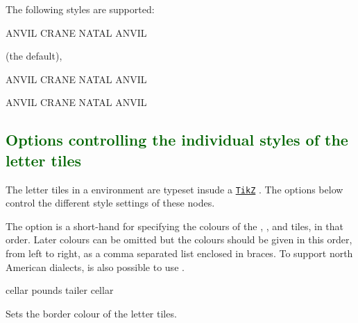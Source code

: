 \documentclass[svgnames]{report}
\newcommand\ctan[1]{\href{https://www.ctan.org/pkg/#1}{\texttt{#1}}}
\newcommand\Section[1]{\subsection{\textcolor{DarkGreen}{#1}}}
\begin{document}
  The following styles are supported:


  \begin{example}
    \begin{wordle}[style=sutom]{ANVIL}
      CRANE
      NATAL
      ANVIL
    \end{wordle}
  \end{example}

   (the default),

  \begin{example}
    \begin{wordle}[style=standard]{ANVIL}
      CRANE
      NATAL
      ANVIL
    \end{wordle}
  \end{example}


  \begin{example}
    \begin{wordle}[style=hard]{ANVIL}
      CRANE
      NATAL
      ANVIL
    \end{wordle}
  \end{example}

  \Section{Options controlling the individual styles of the letter tiles}

  The letter tiles in a  environment are typeset insude
  a \ctan{TikZ} \keyword{\node}. The options below control the different
  style settings of these nodes.


  The  option is a short-hand for specifying the colours
  of the , ,  and
   tiles, in that order. Later colours can be omitted but
  the colours should be given in this order, from left to right, as a
  comma separated list enclosed in braces. To support north American
  dialects, is also possible to use .

  \begin{example}
    \begin{wordle}[colour={LightGray,Orange,Teal}]{cellar}
      pounds
      tailer
      cellar
    \end{wordle}
  \end{example}


  Sets the border colour of the  letter tiles.
\end{document}
